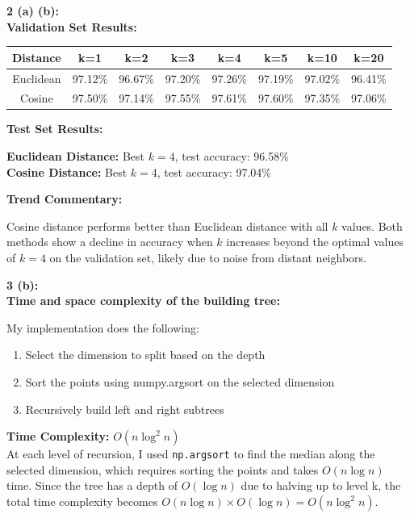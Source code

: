 \documentclass[12pt]{article}
\begin{document}
\textbf{2 (a) (b):}\\
\textbf{Validation Set Results:}
\begin{enumerate}

\begin{center}
\begin{tabular}{|c|c|c|c|c|c|c|c|}
\hline
\textbf{Distance} & \textbf{k=1} & \textbf{k=2} & \textbf{k=3} & \textbf{k=4} & \textbf{k=5} & \textbf{k=10} & \textbf{k=20} \\
\hline
Euclidean & 97.12\% & 96.67\% & 97.20\% & 97.26\% & 97.19\% & 97.02\% & 96.41\% \\
\hline
Cosine & 97.50\% & 97.14\% & 97.55\% & 97.61\% & 97.60\% & 97.35\% & 97.06\% \\
\hline
\end{tabular}
\end{center}

\end{enumerate}
\textbf{Test Set Results:}
\begin{enumerate}
\textbf{Euclidean Distance:} Best $k = 4$, test accuracy: 96.58\%\\

\textbf{Cosine Distance:} Best $k = 4$, test accuracy: 97.04\%
\end{enumerate}
\textbf{Trend Commentary:}
\begin{enumerate}
Cosine distance performs better than Euclidean distance with all $k$ values. Both methods show a decline in accuracy when $k$ increases beyond the optimal values of $k=4$ on the validation set, likely due to noise from distant neighbors.
\end{enumerate}
\textbf{3 (b):}\\
\textbf{Time and space complexity of the building tree:}

My implementation does the following:
\begin{enumerate}
\item Select the dimension to split based on the depth
\item Sort the points using {numpy.argsort} on the selected dimension
\item Recursively build left and right subtrees
\end{enumerate}

\textbf{Time Complexity:} $O(n \log^2 n)$\\
At each level of recursion, I used \texttt{np.argsort} to find the median along the selected dimension, which requires sorting the points and takes $O(n \log n)$ time. Since the tree has a depth of $O(\log n)$ due to halving up to level k, the total time complexity becomes $O(n \log n) \times O(\log n) = O(n \log^2 n)$.
\end{document}
